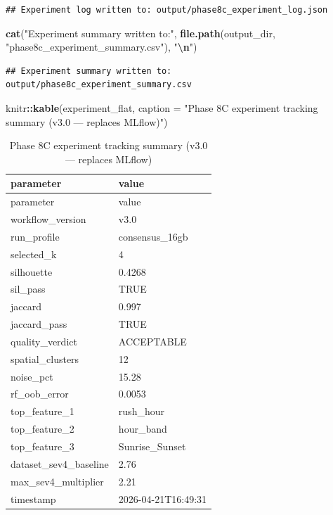 \documentclass[
]{article}
\newenvironment{Shaded}{\begin{snugshade}}{\end{snugshade}}
\newcommand{\AttributeTok}[1]{\textcolor[rgb]{0.13,0.29,0.53}{#1}}
\newcommand{\FunctionTok}[1]{\textcolor[rgb]{0.13,0.29,0.53}{\textbf{#1}}}
\newcommand{\NormalTok}[1]{#1}
\newcommand{\SpecialCharTok}[1]{\textcolor[rgb]{0.81,0.36,0.00}{\textbf{#1}}}
\newcommand{\StringTok}[1]{\textcolor[rgb]{0.31,0.60,0.02}{#1}}
\begin{document}
\begin{verbatim}
## Experiment log written to: output/phase8c_experiment_log.json
\end{verbatim}

\begin{Shaded}
\begin{Highlighting}[]
\FunctionTok{cat}\NormalTok{(}\StringTok{"Experiment summary written to:"}\NormalTok{, }\FunctionTok{file.path}\NormalTok{(output\_dir, }\StringTok{"phase8c\_experiment\_summary.csv"}\NormalTok{), }\StringTok{"}\SpecialCharTok{\textbackslash{}n}\StringTok{"}\NormalTok{)}
\end{Highlighting}
\end{Shaded}

\begin{verbatim}
## Experiment summary written to: output/phase8c_experiment_summary.csv
\end{verbatim}

\begin{Shaded}
\begin{Highlighting}[]
\NormalTok{knitr}\SpecialCharTok{::}\FunctionTok{kable}\NormalTok{(experiment\_flat, }\AttributeTok{caption =} \StringTok{"Phase 8C experiment tracking summary (v3.0 — replaces MLflow)"}\NormalTok{)}
\end{Highlighting}
\end{Shaded}

\begin{longtable}[]{@{}ll@{}}
\caption{Phase 8C experiment tracking summary (v3.0 --- replaces
MLflow)}\tabularnewline
\toprule\noalign{}
parameter & value \\
\midrule\noalign{}
\endfirsthead
\toprule\noalign{}
parameter & value \\
\midrule\noalign{}
\endhead
\bottomrule\noalign{}
\endlastfoot
workflow\_version & v3.0 \\
run\_profile & consensus\_16gb \\
selected\_k & 4 \\
silhouette & 0.4268 \\
sil\_pass & TRUE \\
jaccard & 0.997 \\
jaccard\_pass & TRUE \\
quality\_verdict & ACCEPTABLE \\
spatial\_clusters & 12 \\
noise\_pct & 15.28 \\
rf\_oob\_error & 0.0053 \\
top\_feature\_1 & rush\_hour \\
top\_feature\_2 & hour\_band \\
top\_feature\_3 & Sunrise\_Sunset \\
dataset\_sev4\_baseline & 2.76 \\
max\_sev4\_multiplier & 2.21 \\
timestamp & 2026-04-21T16:49:31 \\
\end{longtable}
\end{document}

